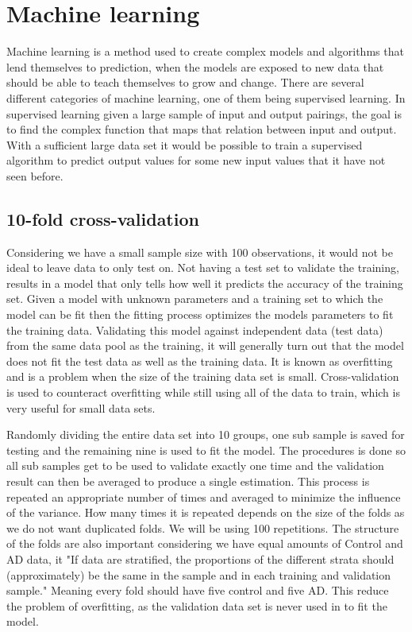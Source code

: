 \section{Machine learning}

Machine learning is a method used to create complex models and algorithms that lend themselves to prediction, when the models are exposed to new data that should be able to teach themselves to grow and change.
There are several different categories of machine learning, one of them being supervised learning. In supervised learning given a large sample of input and output pairings, the goal is to find the complex function that maps that relation between input and output. With a sufficient large data set it would be possible to train a supervised algorithm to predict output values for some new input values that it have not seen before.


\subsection{10-fold cross-validation}
Considering we have a small sample size with 100 observations, it would not be ideal to leave data to only test on. Not having a test set to validate the training, results in a model that only tells how well it predicts the accuracy of the training set.
Given a model with unknown parameters and a training set to which the model can be fit then the fitting process optimizes the models parameters to fit the training data. Validating this model against independent data (test data) from the same data pool as the training, it will generally turn out that the model does not fit the test data as well as the training data. It is known as overfitting and is a problem when the size of the training data set is small. Cross-validation is used to counteract overfitting while still using all of the data to train, which is very useful for small data sets.

Randomly dividing the entire data set into 10 groups, one sub sample is saved for testing and the remaining nine is used to fit the model. The procedures is done so all sub samples get to be used to validate exactly one time and the validation result can then be averaged to produce a single estimation. This process is repeated an appropriate number of times and averaged to minimize the influence of the variance. How many times it is repeated depends on the size of the folds as we do not want duplicated folds. We will be using 100 repetitions.
The structure of the folds are also important considering we have equal amounts of Control and AD data, it
"If data are stratified, the proportions of the different strata should (approximately) be the same in the sample and in each training and validation sample." \cite{arlot2010survey}
Meaning every fold should have five control and five AD.
This reduce the problem of overfitting, as the validation data set is never used in to fit the model.



